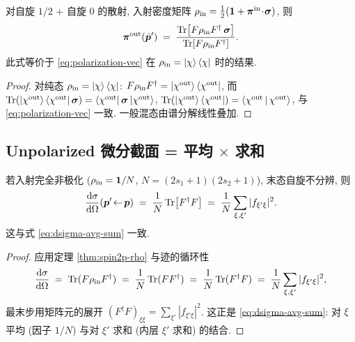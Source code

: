 \begin{corollary}\label{cor:spin2p-pi-out}
对自旋 $1/2$ + 自旋 $0$ 的散射, 入射密度矩阵 $\rho_{\rm in}=\tfrac12(\mathbf 1+\bm\pi^{\rm in}\!\cdot\!\bm\sigma)$, 则
\begin{equation}
  \bm\pi^{\rm out}(\hat{\bm p}')\;=\;\frac{\operatorname{Tr}\bigl[F\rho_{\rm in}F^\dagger\,\bm\sigma\bigr]}{\operatorname{Tr}[F\rho_{\rm in}F^\dagger]}.
  \label{eq:spin2p-pi-out}
\end{equation}
此式等价于 \eqref{eq:polarization-vec} 在 $\rho_{\rm in}=\ket\chi\bra\chi$ 时的结果.
\end{corollary}

\begin{proof}
对纯态 $\rho_{\rm in}=\ket\chi\bra\chi$: $F\rho_{\rm in}F^\dagger=\ket{\chi^{\rm out}}\bra{\chi^{\rm out}}$, 而 $\operatorname{Tr}(\ket{\chi^{\rm out}}\bra{\chi^{\rm out}}\bm\sigma)=\bra{\chi^{\rm out}}\bm\sigma\ket{\chi^{\rm out}}$, $\operatorname{Tr}(\ket{\chi^{\rm out}}\bra{\chi^{\rm out}})=\left\langle \chi^{\rm out} \,\middle|\, \chi^{\rm out} \right\rangle$, 与 \eqref{eq:polarization-vec} 一致. 一般混态由谱分解线性叠加.
\end{proof}

\subsection{Unpolarized 微分截面 = 平均 $\times$ 求和}\label{sec:spin2p-unpol}

\begin{theorem}\label{thm:spin2p-unpol}
若入射完全非极化 ($\rho_{\rm in}=\mathbf 1/N$, $N=(2s_1+1)(2s_2+1)$), 末态自旋不分辨, 则
\begin{equation}
  \frac{\mathrm{d}\sigma}{\mathrm{d}\Omega}(\bm p'\!\leftarrow\!\bm p)
  \;=\;\frac{1}{N}\operatorname{Tr}\bigl[F^\dagger F\bigr]
  \;=\;\frac{1}{N}\sum_{\xi,\xi'}|f_{\xi'\xi}|^2.
  \label{eq:spin2p-unpol-trace}
\end{equation}
这与式 \eqref{eq:dsigma-avg-sum} 一致.
\end{theorem}

\begin{proof}
应用定理 \ref{thm:spin2p-rho} 与迹的循环性
\begin{equation}
  \frac{\mathrm{d}\sigma}{\mathrm{d}\Omega}\;=\;\operatorname{Tr}(F\rho_{\rm in}F^\dagger)
  \;=\;\frac{1}{N}\operatorname{Tr}(FF^\dagger)\;=\;\frac{1}{N}\operatorname{Tr}(F^\dagger F)
  \;=\;\frac{1}{N}\sum_{\xi,\xi'}|f_{\xi'\xi}|^2,
\end{equation}
最末步用矩阵元的展开 $(F^\dagger F)_{\xi\xi}=\sum_{\xi'}|f_{\xi'\xi}|^2$. 这正是 \eqref{eq:dsigma-avg-sum}: 对 $\xi$ 平均 (因子 $1/N$) 与对 $\xi'$ 求和 (内层 $\xi'$ 求和) 的结合.
\end{proof}

